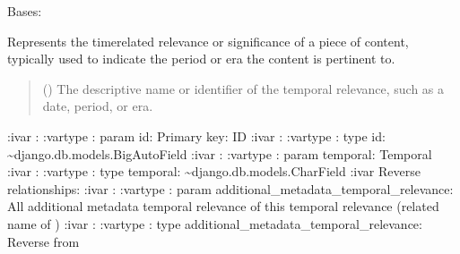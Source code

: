 \documentclass[letterpaper,10pt,english]{sphinxmanual}
\begin{document}

\begin{fulllineitems}
\label{\detokenize{source/meta_models_management:meta_models_management.models.TemporalRelevance}}
\pysigstartsignatures
{}
\pysigstopsignatures
\sphinxAtStartPar
Bases: 

\sphinxAtStartPar
Represents the time\sphinxhyphen{}related relevance or significance of a piece of content, typically used to indicate the period or era the content is pertinent to.
\begin{quote}\begin{description}
\sphinxAtStartPar
{} () \textendash{} The descriptive name or identifier of the temporal relevance, such as a date, period, or era.

\end{description}\end{quote}

\sphinxAtStartPar
:ivar : 
:vartype : param id: Primary key: ID
:ivar : 
:vartype : type id: \textasciitilde{}django.db.models.BigAutoField
:ivar : 
:vartype : param temporal: Temporal
:ivar :
:vartype : type temporal: \textasciitilde{}django.db.models.CharField
:ivar Reverse relationships:
:ivar : 
:vartype : param additional\_metadata\_temporal\_relevance: All additional metadata temporal relevance of this temporal relevance (related name of )
:ivar : 
:vartype : type additional\_metadata\_temporal\_relevance: Reverse  from {\hyperref[\detokenize{source/meta_models_management:meta_models_management.models.AdditionalMetadata}]{}}


\end{fulllineitems}
\end{document}
